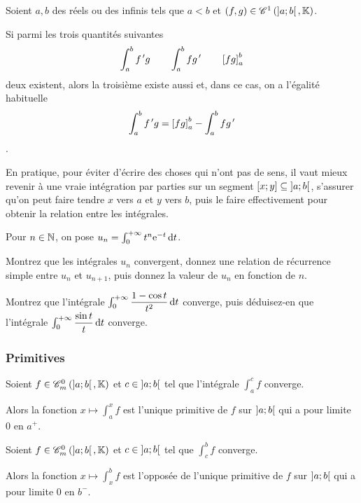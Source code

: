 \begin{prop}
Soient \(a,b\) des réels ou des infinis tels que \(a<b\) et \(\left(f,g\right)\in\mathscr{C}^{1}\left(\left]a;b\right[,\mathbb{K}\right)\).

Si parmi les trois quantités suivantes \[\int_a^bf^{\,\prime} g\qquad\int_a^bfg^{\,\prime}\qquad\left[fg\right]_a^b\] deux existent, alors la troisième existe aussi et, dans ce cas, on a l'égalité habituelle \[\int_a^bf^{\,\prime} g=\left[fg\right]_a^b-\int_a^bfg^{\,\prime}\].
\end{prop}

En pratique, pour éviter d'écrire des choses qui n'ont pas de sens, il vaut mieux revenir à une vraie intégration par parties sur un segment \(\left[x;y\right]\subseteq\left]a;b\right[\), s'assurer qu'on peut faire tendre \(x\) vers \(a\) et \(y\) vers \(b\), puis le faire effectivement pour obtenir la relation entre les intégrales.

\begin{exo}
Pour \(n\in\mathbb{N}\), on pose \(u_n=\int_0^{\pinf}t^n\e{-t}\odif{t}\).

Montrez que les intégrales \(u_n\) convergent, donnez une relation de récurrence simple entre \(u_n\) et \(u_{n+1}\), puis donnez la valeur de \(u_n\) en fonction de \(n\).
\end{exo}

\begin{exo}
Montrez que l'intégrale \(\int_0^{\pinf}\dfrac{1-\cos t}{t^2}\odif{t}\) converge, puis déduisez-en que l'intégrale \(\int_0^{\pinf}\dfrac{\sin t}{t}\odif{t}\) converge.
\end{exo}

\subsubsection{Primitives}

\begin{prop}
Soient \(f\in\contm[\intervee{a}{b}]\) et \(c\in\left]a;b\right[\) tel que l'intégrale \(\int_a^cf\) converge.

Alors la fonction \(x\mapsto\int_a^xf\) est l'unique primitive de \(f\) sur \(\left]a;b\right[\) qui a pour limite \(0\) en \(a^+\).
\end{prop}

\begin{prop}
Soient \(f\in\contm[\intervee{a}{b}]\) et \(c\in\left]a;b\right[\) tel que \(\int_c^bf\) converge.

Alors la fonction \(x\mapsto\int_x^bf\) est l'opposée de l'unique primitive de \(f\) sur \(\left]a;b\right[\) qui a pour limite \(0\) en \(b^-\).
\end{prop}

